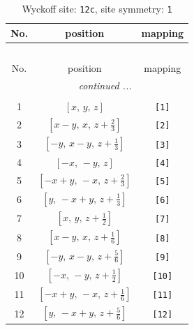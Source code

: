 \documentclass[fleqn,8pt]{jsarticle}
\begin{document}
\begin{longtable}{ccc}
\caption{Wyckoff site: {\tt 12c}, site symmetry: {\tt 1}}
 \\
 \hline \hline
No. & position & mapping \\ \hline \endfirsthead

\multicolumn{2}{l}{\tablename\ \thetable{}} \\
 \hline \hline
No. & position & mapping \\ \hline \endhead

 \hline \hline
\multicolumn{2}{r}{\footnotesize\it continued ...} \\ \endfoot

 \hline \hline
\multicolumn{2}{r}{} \\ \endlastfoot

1 & $\left[ x,\, y,\, z \right]$ & {\tt [1]} \\ \hline
2 & $\left[ x - y,\, x,\, z + \frac{2}{3} \right]$ & {\tt [2]} \\ \hline
3 & $\left[ - y,\, x - y,\, z + \frac{1}{3} \right]$ & {\tt [3]} \\ \hline
4 & $\left[ - x,\, - y,\, z \right]$ & {\tt [4]} \\ \hline
5 & $\left[ - x + y,\, - x,\, z + \frac{2}{3} \right]$ & {\tt [5]} \\ \hline
6 & $\left[ y,\, - x + y,\, z + \frac{1}{3} \right]$ & {\tt [6]} \\ \hline
7 & $\left[ x,\, y,\, z + \frac{1}{2} \right]$ & {\tt [7]} \\ \hline
8 & $\left[ x - y,\, x,\, z + \frac{1}{6} \right]$ & {\tt [8]} \\ \hline
9 & $\left[ - y,\, x - y,\, z + \frac{5}{6} \right]$ & {\tt [9]} \\ \hline
10 & $\left[ - x,\, - y,\, z + \frac{1}{2} \right]$ & {\tt [10]} \\ \hline
11 & $\left[ - x + y,\, - x,\, z + \frac{1}{6} \right]$ & {\tt [11]} \\ \hline
12 & $\left[ y,\, - x + y,\, z + \frac{5}{6} \right]$ & {\tt [12]} \\
\end{longtable}
\end{document}
